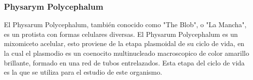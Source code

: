 \subsubsection{Physarym Polycephalum}
    El Physarum Polycephalum, tambi\'en conocido como "The Blob", 
        o "La Mancha", es un protista con formas celulares diversas. El Physarum Polycephalum
        es un mixomiceto acelular, esto proviene de la etapa plasmoidal de su ciclo de vida,
        en la cual el plasmodio es un coenocito multinucleado macroscopico de color amarillo 
        brillante, formado en una red de tubos entrelazados. Esta etapa del ciclo de vida es 
        la que se utiliza para el estudio de este organismo.
    \vskip 0.5cm
    